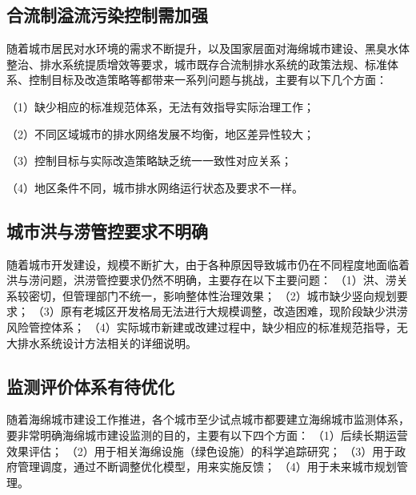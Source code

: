 \documentclass[]{book}
\begin{document}
\hypertarget{ux5408ux6d41ux5236ux6ea2ux6d41ux6c61ux67d3ux63a7ux5236ux9700ux52a0ux5f3a}{%
\subsection{合流制溢流污染控制需加强}\label{ux5408ux6d41ux5236ux6ea2ux6d41ux6c61ux67d3ux63a7ux5236ux9700ux52a0ux5f3a}}

随着城市居民对水环境的需求不断提升，以及国家层面对海绵城市建设、黑臭水体整治、排水系统提质增效等要求，城市既存合流制排水系统的政策法规、标准体系、控制目标及改造策略等都带来一系列问题与挑战，主要有以下几个方面：

（1）缺少相应的标准规范体系，无法有效指导实际治理工作；

（2）不同区域城市的排水网络发展不均衡，地区差异性较大；

（3）控制目标与实际改造策略缺乏统一一致性对应关系；

（4）地区条件不同，城市排水网络运行状态及要求不一样。

\hypertarget{ux57ceux5e02ux6d2aux4e0eux6d9dux7ba1ux63a7ux8981ux6c42ux4e0dux660eux786e}{%
\subsection{城市洪与涝管控要求不明确}\label{ux57ceux5e02ux6d2aux4e0eux6d9dux7ba1ux63a7ux8981ux6c42ux4e0dux660eux786e}}

随着城市开发建设，规模不断扩大，由于各种原因导致城市仍在不同程度地面临着洪与涝问题，洪涝管控要求仍然不明确，主要存在以下主要问题：
（1）洪、涝关系较密切，但管理部门不统一，影响整体性治理效果；
（2）城市缺少竖向规划要求；
（3）原有老城区开发格局无法进行大规模调整，改造困难，现阶段缺少洪涝风险管控体系；
（4）实际城市新建或改建过程中，缺少相应的标准规范指导，无大排水系统设计方法相关的详细说明。

\hypertarget{ux76d1ux6d4bux8bc4ux4ef7ux4f53ux7cfbux6709ux5f85ux4f18ux5316}{%
\subsection{监测评价体系有待优化}\label{ux76d1ux6d4bux8bc4ux4ef7ux4f53ux7cfbux6709ux5f85ux4f18ux5316}}

随着海绵城市建设工作推进，各个城市至少试点城市都要建立海绵城市监测体系，要非常明确海绵城市建设监测的目的，主要有以下四个方面：
（1）后续长期运营效果评估；
（2）用于相关海绵设施（绿色设施）的科学追踪研究；
（3）用于政府管理调度，通过不断调整优化模型，用来实施反馈；
（4）用于未来城市规划管理。
\end{document}
